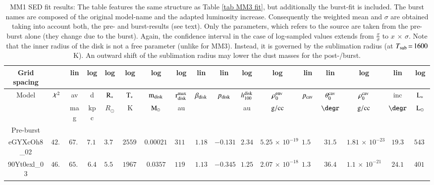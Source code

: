 \begin{appendix}
\begin{table}
\vspace*{9cm}
\caption[]{MM1 SED fit results: The table features the same structure as Table \ref{tab MM3 fit}, but additionally the burst-fit is included. %
The burst names are composed of the original model-name and the adapted luminosity increase. Consequently the weighted mean and $\sigma$ are obtained taking into account both, the pre- and burst-results (see text). Only the parameters, which refers to the source are taken from the pre-burst alone (they change due to the burst). Again, the confidence interval in the case of log-sampled values extends from $\frac{x}{\sigma}$ to $x \,{\times}\, \sigma$.  %
Note that the inner radius of the disk is not a free parameter (unlike for MM3). Instead, it is governed by the sublimation radius (at $T_{\rm sub}\,{=}\,1600$K). An outward shift of the sublimation radius may lower the dust masses for the post-/burst. 
} 
\label{tab MM1 fit} 
\begin{tabular}{ccccccccccccccccc}
\hline
Grid spacing &  & lin & log & log & log & log & log & lin & lin & log & log & lin & lin & log & lin & log\\
\hline 
Model & $\goodchi^2$ & av & d & $\rm R_*$ & $\rm T_*$ & $\rm m_{\rm disk}$ & $\rm r_{\rm disk}^{\rm max}$ & $\beta_{\rm disk}$ & $p_{\rm disk}$ & $h_{\rm 100}^{\rm disk}$ & $\rho_0^{\rm env}$ & $p_{\rm cav}$ & $\theta_0^{\rm cav}$ & $\rho_0^{\rm cav}$ & inc & $\rm L_*$\\ 
 &  & mag & kpc & $R_\odot$ & K & ${\rm M}_\odot$ & au &  &  & au & ${\rm g/cc}$ &  & $\degr$  & ${\rm g/cc}$ & $\degr$ & ${\rm L}_\odot$\\ 
\noalign{\smallskip} 
\hline 
Pre-burst\\
\noalign{\smallskip} 
\hline 
\noalign{\smallskip} 
eGYXcOh8\_02 & $ 42.8$ & $ 67.6$ & $ 7.11$ & $ 3.79$ & $ 25590$ & $ 0.000217$ & $ 3110$ & $ 1.18$ & $ -0.131$ & $ 2.34$ & $ 5.25\,{\times}\,10^{-19}$ & $ 1.56$ & $ 31.5$ & $ 1.81\,{\times}\,10^{-23}$ & $ 19.3$ & $ 5437$ \\ 
90Yt0exl\_03 & $ 46.6$ & $ 65.5$ & $ 6.4$ & $ 5.51$ & $ 19670$ & $ 0.0357$ & $ 1191$ & $ 1.13$ & $ -0.345$ & $ 1.25$ & $ 2.07\,{\times}\,10^{-18}$ & $ 1.39$ & $ 36.4$ & $ 1.1\,{\times}\,10^{-21}$ & $ 24.1$ & $ 4017$ \\ 

\end{tabular}
\end{table}
\end{appendix}

